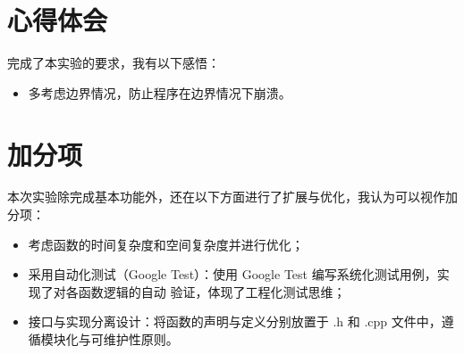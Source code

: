 \documentclass[dvipsnames, svgnames,a4paper,11pt]{article}
\begin{document}
\section{心得体会}
完成了本实验的要求，我有以下感悟：
\begin{itemize}
    \item 多考虑边界情况，防止程序在边界情况下崩溃。
\end{itemize}
\section{加分项}
本次实验除完成基本功能外，还在以下方面进行了扩展与优化，我认为可以视作加分项：
\begin{itemize}
    \item 考虑函数的时间复杂度和空间复杂度并进行优化；
    \item 采用自动化测试（Google Test）：使用 Google Test 编写系统化测试用例，实现了对各函数逻辑的自动
验证，体现了工程化测试思维；
    \item 接口与实现分离设计：将函数的声明与定义分别放置于 .h 和 .cpp 文件中，遵循模块化与可维护性原则。
\end{itemize}



\clearpage
\end{document}
